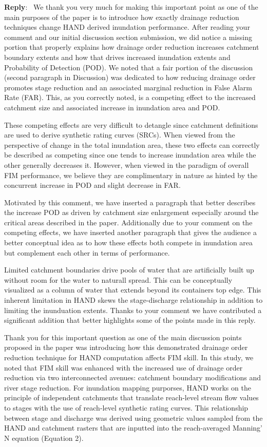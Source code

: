 \documentclass[11pt]{article}
\newcounter{reviewer}
\newcounter{point}[reviewer]
\newenvironment{reply}
   {\medskip \noindent \begin{sf}\textbf{Reply}:\  }
   {\medskip \end{sf}}
\begin{document}
\begin{reply}
We thank you very much for making this important point as one of the main purposes of the paper is to introduce how exactly drainage reduction techniques change HAND derived inundation performance.
After reading your comment and our initial discussion section submission, we did notice a missing portion that properly explains how drainage order reduction increases catchment boundary extents and how that drives increased inundation extents and Probability of Detection (POD).
We noted that a fair portion of the discussion (second paragraph in Discussion) was dedicated to how reducing drainage order promotes stage reduction and an associated marginal reduction in False Alarm Rate (FAR).
This, as you correctly noted, is a competing effect to the increased catchment size and associated increase in inundation area and POD.

These competing effects are very difficult to detangle since catchment definitions are used to derive synthetic rating curves (SRCs).
When viewed from the perspective of change in the total inundation area, these two effects can correctly be described as competing since one tends to increase inundation area while the other generally decreases it.
However, when viewed in the paradigm of overall FIM performance, we believe they are complimentary in nature as hinted by the concurrent increase in POD and slight decrease in FAR.

Motivated by this comment, we have inserted a paragraph that better describes the increase POD as driven by catchment size enlargement especially around the critical areas described in the paper.
Additionally due to your comment on the competing effects, we have inserted another paragraph that gives the audience a better conceptual idea as to how these effects both compete in inundation area but complement each other in terms of performance.

Limited catchment boundaries drive pools of water that are artificially built up without room for the water to naturall spread. 
This can be conceptually visualized as a column of water that extends beyond its containers top edge.
This inherent limitation in HAND skews the stage-discharge relationship in addition to limiting the inunduation extents.
Thanks to your comment we have contributed a significant addition that better highlights some of the points made in this reply.

Thank you for this important question as one of the main discussion points proposed in the paper was introducing how this demonstrated drainage order reduction technique for HAND computation affects FIM skill.
In this study, we noted that FIM skill was enhanced with the increased use of drainage order reduction via two interconnected avenues: catchment boundary modifications and river stage reduction.
For inundation mapping purporses, HAND works on the principle of independent catchments that translate reach-level stream flow values to stages with the use of reach-level synthetic rating curves.
This relationship between stage and discharge was derived using geometric values sampled from the HAND and catchment rasters that are inputted into the reach-averaged Manning' N equation (Equation 2).


\end{reply}
\end{document}
